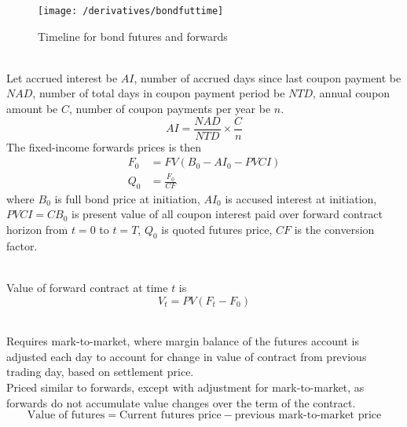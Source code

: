 \begin{figure}[H]
\centering
\texttt{[image: /derivatives/bondfuttime]}
\caption{Timeline for bond futures and forwards}
\end{figure}

\begin{method} \\
Let accrued interest be $AI$, number of accrued days since last coupon payment be $NAD$, number of total days in coupon payment period be $NTD$, annual coupon amount be $C$, number of coupon payments per year be $n$.
\begin{equation}
AI = \frac{NAD}{NTD} \times \frac{C}{n} \nonumber
\end{equation}
The fixed-income forwards prices is then
\begin{align}
F_0 &= FV(B_0 - AI_0 - PVCI) \nonumber \\
Q_0 &= \frac{F_0}{CF} \nonumber
\end{align}
where $B_0$ is full bond price at initiation, $AI_0$ is accused interest at initiation, $PVCI = CB_0$ is present value of all coupon interest paid over forward contract horizon from $t = 0$ to $t = T$, $Q_0$ is quoted futures price, $CF$ is the conversion factor.
\end{method}

\begin{method} \\
Value of forward contract at time $t$ is
\begin{equation}
V_t = PV(F_t - F_0) \nonumber
\end{equation}
\end{method}

\begin{remark} \\
Requires mark-to-market, where margin balance of the futures account is adjusted each day to account for change in value of contract from previous trading day, based on settlement price.\\
Priced similar to forwards, except with adjustment for mark-to-market, as forwards do not accumulate value changes over the term of the contract.
\begin{equation}
\text{Value of futures} = \text{Current futures price} - \text{previous mark-to-market price} \nonumber
\end{equation}
\end{remark}